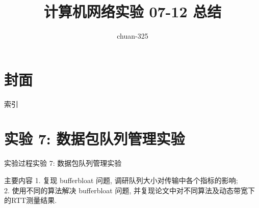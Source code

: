 \documentclass{beamer}
\title{计算机网络实验 07-12 总结}
\author{chuan-325}
\institute[UCAS]{University of Chinese Academy of Sciences}
\begin{document}
\section*{封面}
\begin{frame}
    \maketitle
\end{frame}

\begin{frame}{索引}
    \tableofcontents
\end{frame}
\section{实验 7: 数据包队列管理实验}
\begin{frame}
    \sectionpage
\end{frame}

\begin{frame}{实验过程}{实验 7: 数据包队列管理实验}
    \begin{block}{主要内容}
        1. 复现 bufferbloat 问题, 调研队列大小对传输中各个指标的影响;\\
        2. 使用不同的算法解决 bufferbloat 问题,
        并复现论文中对不同算法及动态带宽下的RTT测量结果.
    \end{block}
\end{frame}
\end{document}
